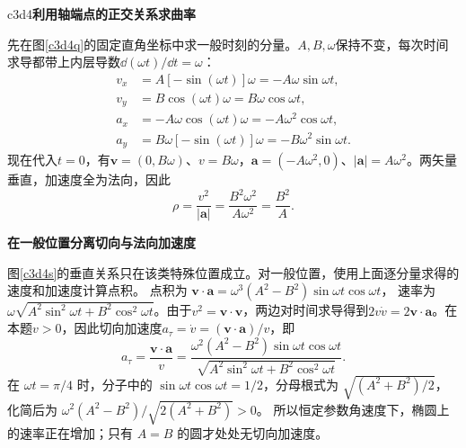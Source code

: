 \begin{drillsolution}{c3d4}\textbf{利用轴端点的正交关系求曲率}\par\nobreak
先在图\ref{c3d4q}的固定直角坐标中求一般时刻的分量。$A,B,\omega$保持不变，每次时间求导都带上内层导数$\dd(\omega t)/\dd t=\omega$：
\begin{align*}
v_x&=A[-\sin(\omega t)]\omega=-A\omega\sin\omega t,\\
v_y&=B\cos(\omega t)\omega=B\omega\cos\omega t,\\
a_x&=-A\omega\cos(\omega t)\omega=-A\omega^2\cos\omega t,\\
a_y&=B\omega[-\sin(\omega t)]\omega=-B\omega^2\sin\omega t.
\end{align*}
现在代入$t=0$，有$\bm v=(0,B\omega)$、$v=B\omega$，$\bm a=(-A\omega^2,0)$、$|\bm a|=A\omega^2$。两矢量垂直，加速度全为法向，因此
\[
\rho=\frac{v^2}{|\bm a|}
=\frac{B^2\omega^2}{A\omega^2}=\frac{B^2}{A}.
\]



\par\medskip{}\noindent\textbf{在一般位置分离切向与法向加速度}\par\nobreak
图\ref{c3d4s}的垂直关系只在该类特殊位置成立。对一般位置，使用上面逐分量求得的速度和加速度计算点积。
点积为
$\bm v\cdot\bm a=\omega^3(A^2-B^2)\sin\omega t\cos\omega t$，
速率为$\omega\sqrt{A^2\sin^2\omega t+B^2\cos^2\omega t}$。由于$v^2=\bm v\cdot\bm v$，两边对时间求导得到$2v\dot v=2\bm v\cdot\bm a$。在本题$v>0$，因此切向加速度$a_\tau=\dot v=(\bm v\cdot\bm a)/v$，即
\[
 a_\tau=\frac{\bm v\cdot\bm a}{v}
 =\frac{\omega^2(A^2-B^2)\sin\omega t\cos\omega t}
 {\sqrt{A^2\sin^2\omega t+B^2\cos^2\omega t}}.
\]
在 $\omega t=\pi/4$ 时，分子中的 $\sin\omega t\cos\omega t=1/2$，分母根式为 $\sqrt{(A^2+B^2)/2}$，化简后为
$\omega^2(A^2-B^2)/\sqrt{2(A^2+B^2)}>0$。
所以恒定参数角速度下，椭圆上的速率正在增加；只有 $A=B$ 的圆才处处无切向加速度。



\end{drillsolution}
